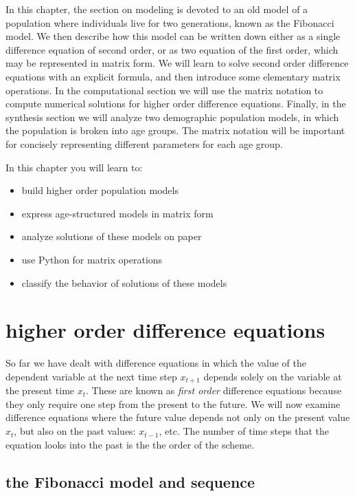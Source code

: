 \documentclass[
  letterpaper,
  DIV=11,
  numbers=noendperiod]{scrreprt}
\providecommand{\tightlist}{%
  \setlength{\itemsep}{0pt}\setlength{\parskip}{0pt}}\usepackage{longtable,booktabs,array}
\begin{document}
In this chapter, the section on modeling is devoted to an old model of a
population where individuals live for two generations, known as the
Fibonacci model. We then describe how this model can be written down
either as a single difference equation of second order, or as two
equation of the first order, which may be represented in matrix form. We
will learn to solve second order difference equations with an explicit
formula, and then introduce some elementary matrix operations. In the
computational section we will use the matrix notation to compute
numerical solutions for higher order difference equations. Finally, in
the synthesis section we will analyze two demographic population models,
in which the population is broken into age groups. The matrix notation
will be important for concisely representing different parameters for
each age group.

In this chapter you will learn to:

\begin{itemize}
\tightlist
\item
  build higher order population models
\item
  express age-structured models in matrix form
\item
  analyze solutions of these models on paper
\item
  use Python for matrix operations
\item
  classify the behavior of solutions of these models
\end{itemize}

\hypertarget{higher-order-difference-equations}{%
\section{higher order difference
equations}\label{higher-order-difference-equations}}

So far we have dealt with difference equations in which the value of the
dependent variable at the next time step \(x_{t+1}\) depends solely on
the variable at the present time \(x_t\). These are known as \emph{first
order} difference equations because they only require one step from the
present to the future. We will now examine difference equations where
the future value depends not only on the present value \(x_t\), but also
on the past values: \(x_{t-1}\), etc. The number of time steps that the
equation looks into the past is the the order of the scheme.

\hypertarget{the-fibonacci-model-and-sequence}{%
\subsection{the Fibonacci model and
sequence}\label{the-fibonacci-model-and-sequence}}
\end{document}
